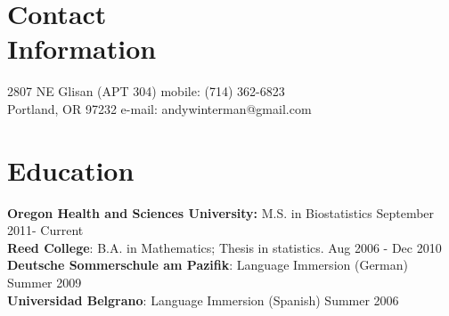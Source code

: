 \documentclass[margin,line]{resume}
\begin{document}
\begin{resume}

    \section{\mysidestyle Contact\\Information}


   2807 NE Glisan (APT 304)                    \hfill  mobile: (714) 362-6823          \vspace{0mm}\\\vspace{0mm}%
    Portland, OR 97232                         \hfill     e-mail: andywinterman@gmail.com      \vspace{0mm}\\%
  \vspace{-4.5mm}%

    \section{\mysidestyle Education}
\textbf{Oregon Health and Sciences University:} M.S. in Biostatistics 
\vspace{1mm} \hfill September 2011- Current \vspace{1 mm}\\
\textbf{Reed College}: B.A. in Mathematics; Thesis in statistics.
 \vspace{1mm} \hfill Aug 2006 - Dec 2010 \vspace{1mm}\\
\textbf{Deutsche Sommerschule am Pazifik}:  Language Immersion (German) \vspace{1mm} \hfill Summer 2009
\vspace{1mm} \\
\textbf{Universidad Belgrano}: Language Immersion (Spanish) \vspace{1mm} \hfill Summer 2006 \vspace{1mm}


\end{resume}
\end{document}

